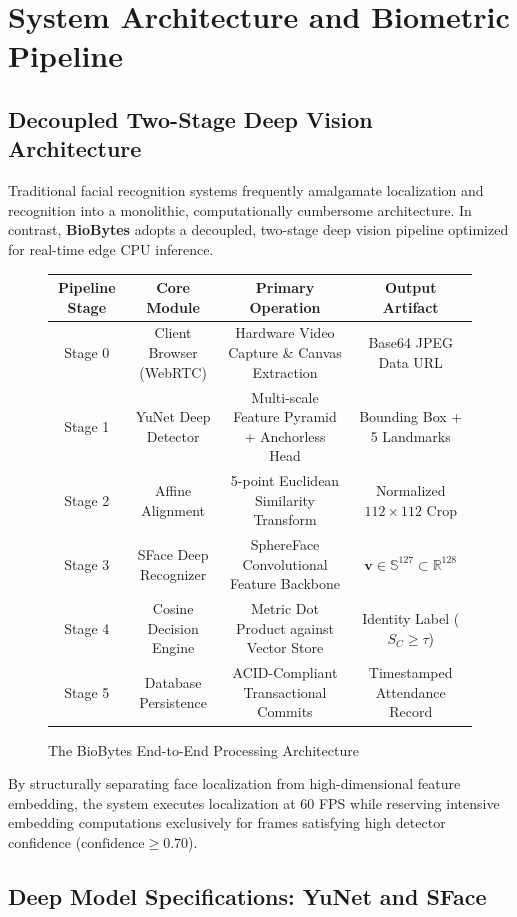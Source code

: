 \chapter{System Architecture and Biometric Pipeline}

\section{Decoupled Two-Stage Deep Vision Architecture}
Traditional facial recognition systems frequently amalgamate localization and recognition into a monolithic, computationally cumbersome architecture. In contrast, \textbf{BioBytes} adopts a decoupled, two-stage deep vision pipeline optimized for real-time edge CPU inference. 

\begin{figure}[htbp]
\centering
\small
\renewcommand{\arraystretch}{1.3}
\begin{tabular}{|c|c|c|c|}
\hline
\textbf{Pipeline Stage} & \textbf{Core Module} & \textbf{Primary Operation} & \textbf{Output Artifact} \\
\hline
Stage 0 & Client Browser (WebRTC) & Hardware Video Capture \& Canvas Extraction & Base64 JPEG Data URL \\
Stage 1 & YuNet Deep Detector & Multi-scale Feature Pyramid + Anchorless Head & Bounding Box + 5 Landmarks \\
Stage 2 & Affine Alignment & 5-point Euclidean Similarity Transform & Normalized $112 \times 112$ Crop \\
Stage 3 & SFace Deep Recognizer & SphereFace Convolutional Feature Backbone & $\mathbf{v} \in \mathbb{S}^{127} \subset \mathbb{R}^{128}$ \\
Stage 4 & Cosine Decision Engine & Metric Dot Product against Vector Store & Identity Label ($S_C \geq \tau$) \\
Stage 5 & Database Persistence & ACID-Compliant Transactional Commits & Timestamped Attendance Record \\
\hline
\end{tabular}
\caption{The BioBytes End-to-End Processing Architecture}
\label{fig:pipeline_table}
\end{figure}

By structurally separating face localization from high-dimensional feature embedding, the system executes localization at 60 FPS while reserving intensive embedding computations exclusively for frames satisfying high detector confidence ($\text{confidence} \geq 0.70$).

\section{Deep Model Specifications: YuNet and SFace}

